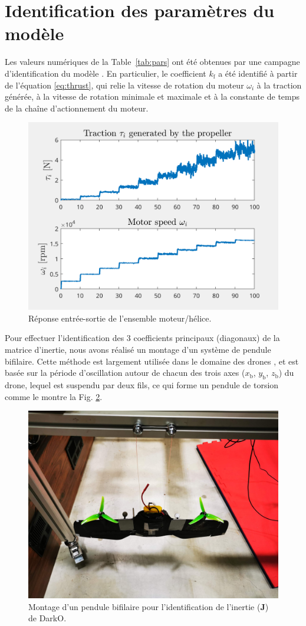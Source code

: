 \section{Identification des paramètres du modèle}
    Les valeurs numériques de la Table~\ref{tab:pars} ont été obtenues par une campagne d'identification du modèle \cite{sansouStage}. En particulier, le coefficient $k_{\text{f}}$ a été identifié à partir de l'équation \eqref{eq:thrust}, qui relie la vitesse de rotation du moteur $\omega_{i}$ à la traction générée, à la vitesse de rotation minimale et maximale et à la constante de temps de la chaîne d'actionnement du moteur.
    \begin{figure}[ht!]
        \centerline{
        \includegraphics[trim=0cm 0cm 0cm 0cm,clip,width=0.5\columnwidth]{figures/ident_motor March 27 2024 1651.png}}
        \caption{Réponse entrée-sortie de l'ensemble moteur/hélice.}
        \label{fig:IOmot}
    \end{figure}
    
    Pour effectuer l'identification des 3 coefficients principaux (diagonaux) de la matrice d'inertie, nous avons réalisé un montage d'un système de pendule bifilaire. Cette méthode est largement utilisée dans le domaine des drones \cite{Jardin2007OptimizedMO}, et est basée sur la période d'oscillation autour de chacun des trois axes ($x_{{\text{b}}}$, $y_{\text{b}}$, $z_{\text{b}}$) du drone, lequel est suspendu par deux fils, ce qui forme un pendule de torsion comme le montre la Fig. \ref{fig:BifilarPend}.

    \begin{figure}[ht!]
        \centerline{
        \includegraphics[trim=20cm 15cm 23cm 0cm,clip,width=0.4\columnwidth]{figures/IMG_20230609_085023.jpg}}
        \caption{Montage d'un pendule bifilaire pour l'identification de l'inertie ($\boldsymbol{J}$) de DarkO.}
        \label{fig:BifilarPend}
    \end{figure}

